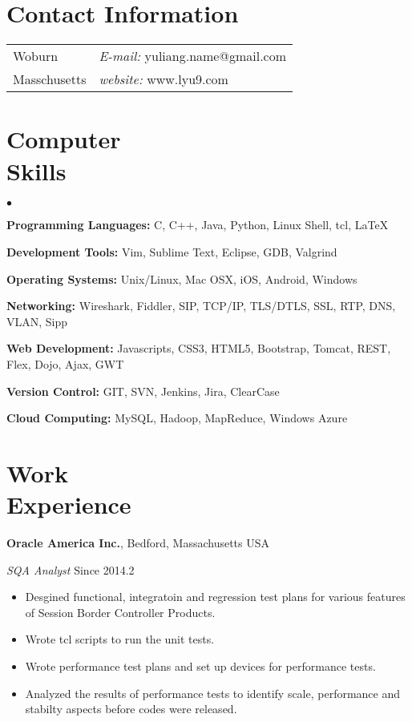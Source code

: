 \documentclass[margin,line]{res}
\newenvironment{list2}{
  \begin{list}{$\bullet$}{%
      \setlength{\itemsep}{0in}
      \setlength{\parsep}{0.05in} \setlength{\parskip}{0in}
      \setlength{\topsep}{0in} \setlength{\partopsep}{0in} 
      \setlength{\leftmargin}{0.2in}}}{\end{list}}
\begin{document}
\vspace{-2cm}

\begin{resume}
\section{\sc Contact Information}
\vspace{.05in}
\begin{tabular}{@{}p{2in}p{4in}}  
Woburn & {\it E-mail:}  yuliang.name@gmail.com \\       
Masschusetts  & {\it website:} www.lyu9.com \\     
\end{tabular}

\section{\sc Computer\\Skills} 
\begin{list2}
\item {\bf Programming Languages:} C, C++, Java, Python, Linux Shell, tcl, \LaTeX
\item {\bf Development Tools:} Vim, Sublime Text, Eclipse, GDB, Valgrind
\item {\bf Operating Systems:}  Unix/Linux, Mac OSX, iOS, Android, Windows
\item {\bf Networking:} Wireshark, Fiddler, SIP, TCP/IP, TLS/DTLS, 
                  SSL, RTP, DNS, VLAN, Sipp
\item {\bf Web Development:} Javascripts, CSS3, HTML5, Bootstrap, Tomcat,
                       REST, Flex, Dojo, Ajax, GWT                     
\item {\bf Version Control:} GIT, SVN, Jenkins, Jira, ClearCase
\item {\bf Cloud Computing:} MySQL, Hadoop, MapReduce, Windows Azure\\
\end{list2}

\section{\sc Work\\Experience}
{\bf Oracle America Inc.}, Bedford, Massachusetts USA

\vspace{-.3cm}
{\em SQA Analyst} \hfill {Since 2014.2}\\
\begin{itemize}
\item Desgined functional, integratoin and regression test plans for various features
of Session Border Controller Products.
\item Wrote tcl scripts to run the unit tests.
\item Wrote performance test plans and set up devices for performance tests.
\item Analyzed the results of performance tests to identify scale, performance and 
stabilty aspects before codes were released.
\end{itemize}


\end{resume}
\end{document}
